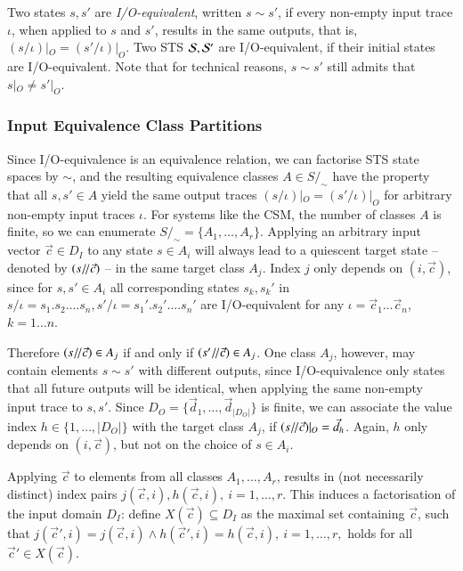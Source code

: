 Two states $s, s'$ are {\it I/O-equivalent}, written $s\sim s'$, 
if every non-empty input trace $\iota$, when applied to $s$ and $s'$, results in the same outputs, that is,  
$(s/\iota)|_O = (s'/\iota)|_O$. Two STS ${\cal S}, {\cal S}'$ are I/O-equivalent, if their initial states 
are I/O-equivalent.
Note that for technical reasons, $s\sim s'$ still admits that $s|_O \neq s'|_O$.   

\subsubsection{Input Equivalence Class Partitions}\label{sec:iecp}

Since I/O-equivalence is an equivalence relation, we can factorise STS state spaces by $\sim$,
and the resulting equivalence classes $A \in S/_\sim$ have the property that all $s,s'\in A$ yield the same output traces $(s/\iota)|_O = (s'/\iota)|_O$  for arbitrary non-empty input traces $\iota$. For systems like the CSM, the number of classes $A$ is finite, so we can enumerate $S/_\sim = \{A_1,\dots,A_r\}$. Applying an arbitrary input vector $\vec c\in D_I$ to any state $s\in A_i$ will always lead to a quiescent target state -- denoted by $(s/\!/ \vec c)$  --
in the same target class $A_j$. 
%
%
Index $j$ only depends on $(i,\vec{c})$, since for $s, s'\in A_i$ all corresponding
states $s_k, s_k'$ in $s/\iota=s_1.s_2\ldots .s_n, s'/\iota=s_1'.s_2'\ldots .s_n'$ are
I/O-equivalent for any $\iota=\vec{c}_1\ldots \vec{c}_n$, $k=1\ldots n$.


Therefore 
$(s/\!/ \vec c)\in A_j$ if and only if $(s'/\!/ \vec c)\in A_j$.
One class $A_j$, however, may contain elements $s \sim s'$ with different outputs, since I/O-equivalence only states that all future outputs will be identical, when applying the same non-empty input trace to $s,s'$. Since $D_O = \{ \vec d_1,\dots,\vec d_{|D_O|} \}$ is finite, we can associate
the value index $h\in \{1,\dots,|D_O|\}$ with the target class $A_j$, 
if $(s/\!/ \vec c)|_O = \vec d_h$. Again, $h$ only depends on $(i,\vec c)$, but not on the choice of $s\in A_i$.

Applying $\vec c$ to elements from all classes $A_1,\dots,A_r$, results in   (not necessarily distinct) index pairs $j(\vec c,i),h(\vec c,i),\ i= 1,\dots,r$.
This induces a factorisation of the input domain $D_I$:   
define $X(\vec c) \subseteq D_I$ as the maximal set containing $\vec c$, such that 
$j(\vec c',i) = j(\vec c,i) \wedge h(\vec c',i) = h(\vec c,i),\ i= 1,\dots,r,$ 
holds for   all $\vec c'\in X(\vec c)$. 

